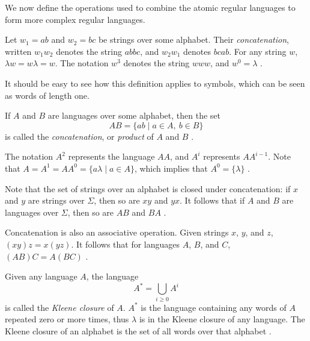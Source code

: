 \documentclass{bcthesis}
\renewcommand{\meo}[1]{}
\newcommand{\footcite}[2]{\xspace\cite[pg.~{#2}]{#1}\xspace}
\begin{document}
	We now define the operations used to combine the atomic regular languages to form more complex regular languages.

	\begin{definition}[Concatenation]
		Let $w_1 = ab$ and $w_2 = bc$ be strings over some alphabet.
		Their \textit{concatenation}, written $w_1 w_2$ denotes the string $abbc$, and $w_2 w_1$ denotes $bcab$.
		For any string $w$, $\lambda w = w \lambda = w$.
		The notation $w^3$ denotes the string $www$, and $w^0 = \lambda$ \footcite{salomaa}{1}.

		It should be easy to see how this definition applies to symbols, which can be seen as words of length one.
	\end{definition}

	\begin{definition}
		If $A$ and $B$ are languages over some alphabet, then the set
		\[
			AB = \{ ab \mid a \in A, \ b \in B \}
		\]
		is called the \textit{concatenation}, or \textit{product} of $A$ and $B$ \footcite{lemmings}{3}.

		The notation $A^2$ represents the language $AA$, and $A^i$ represents $AA^{i-1}$.
		Note that $A = A^1 = AA^0 = \{ a \lambda \mid a \in A \}$, which implies that $A^0 = \{ \lambda \}$ \footcite{lemmings}{3}.
	\end{definition}

	\begin{remark}
		Note that the set of strings over an alphabet is closed under concatenation: if $x$ and $y$ are strings over $\Sigma$, then so are $xy$ and $yx$.
		It follows that if $A$ and $B$ are languages over $\Sigma$, then so are $AB$ and $BA$ \footcite{lemmings}{2}.
		
		Concatenation is also an associative operation.
		Given strings $x$, $y$, and $z$, $(xy)z = x(yz)$.
		It follows that for languages $A$, $B$, and $C$, ${(AB)C = A(BC)}$ \footcite{lemmings}{2}.

		\meo{
			Maybe also note that length has the properties of the logarithm with regard to concatenation.
			It's a curiosity, but not really useful information
		}

	\end{remark}

	\begin{definition}
		Given any language $A$, the language 
		\[
			A^* = \bigcup_{i \geq 0} A^i
		\]
		is called the \textit{Kleene closure} of $A$.
		$A^*$ is the language containing any words of $A$ repeated zero or more times, thus $\lambda$ is in the Kleene closure of any language.
		The Kleene closure of an alphabet is the set of all words over that alphabet \footcite{lemmings}{3}.
	\end{definition}
\end{document}
